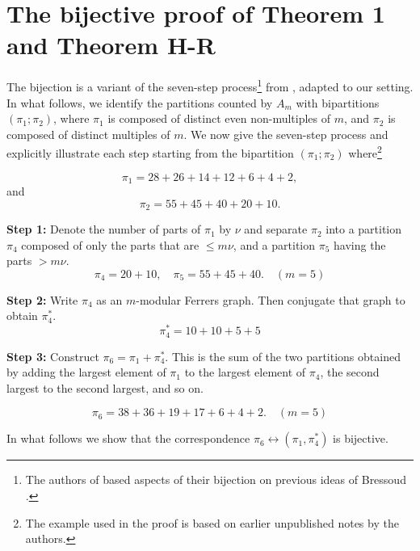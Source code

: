 \documentclass[12pt,a4paper]{amsart}
\theoremstyle{definition}
\theoremstyle{notation}
\theoremstyle{corollary}
\begin{document}
\section{The bijective proof of Theorem 1 and Theorem H-R}
The bijection is a variant of the seven-step process\footnote{The authors of \cite{KAGEABG95} based aspects of their bijection on previous ideas of Bressoud \cite{DMB78,DMB79}.} from \cite{KAGEABG95}, adapted to our setting.\\

In what follows, we identify the partitions counted by $A_m$ with bipartitions
$(\pi_1; \pi_2)$, where $\pi_1$ is composed of distinct even non-multiples of $m$, and $\pi_2$ is composed of distinct multiples of $m$. We now give the seven-step process and explicitly illustrate each step starting from the bipartition
$(\pi_1; \pi_2)$ where\footnote{The example used in the proof is based on earlier unpublished notes by the authors.} 


\[
\pi_1=28+26+14+12+6+4+2
,\]
and
\[
\pi_2=55+45+40+20+10.
\]

\medskip


\textbf{Step 1:} Denote the number of parts of $\pi_1$ by $\nu$ and separate $\pi_2$ into a partition $\pi_4$ composed of only the parts that are $\le m\nu$, and a partition $\pi_5$ having the parts $>m\nu$.
\[
\pi_4=20+10, \quad \pi_5=55+45+40. \quad (m=5)
\]

\medskip


\textbf{Step 2:} Write $\pi_4$ as an $m$-modular Ferrers graph. Then conjugate that graph to obtain $\pi_4^*$.
\[\pi^*_4=10+10+5+5\]

\medskip

\textbf{Step 3:} Construct $\pi_6=\pi_1+\pi^*_4$. This is the sum of the two partitions obtained by adding the largest element of $\pi_1$ to the largest element of $\pi_4$, the second largest to the second largest, and so on.  

\[
\pi_6=38+36+19+17+6+4+2.
 \quad (m=5)\]


\medskip


In what follows we show that the correspondence $\pi_6 \leftrightarrow (\pi_1, \pi^*_4)$ is bijective.\\
\end{document}
